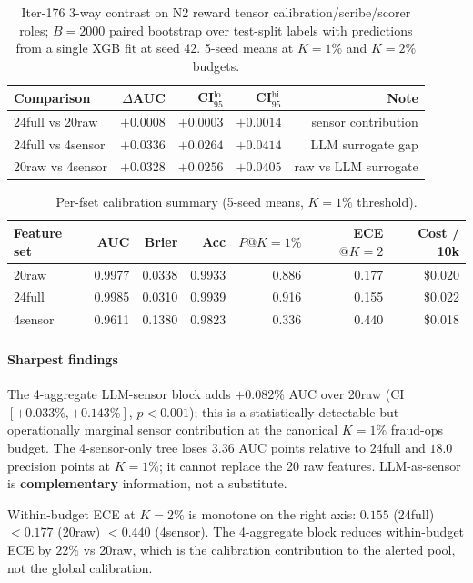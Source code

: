 \begin{table}[h]
\centering\small
\caption{Iter-176 3-way contrast on N2 reward tensor
calibration/scribe/scorer roles; $B{=}2000$ paired bootstrap over
test-split labels with predictions from a single XGB fit at seed 42.
5-seed means at $K{=}1\%$ and $K{=}2\%$ budgets.}
\label{tab:p8-iter176-headline}
\begin{tabular}{lrrrr}
\hline
Comparison & $\Delta$AUC & CI$_{95}^{\mathrm{lo}}$ & CI$_{95}^{\mathrm{hi}}$ & Note \\
\hline
24full vs 20raw & $+0.0008$ & $+0.0003$ & $+0.0014$ & sensor contribution \\
24full vs 4sensor & $+0.0336$ & $+0.0264$ & $+0.0414$ & LLM surrogate gap \\
20raw vs 4sensor & $+0.0328$ & $+0.0256$ & $+0.0405$ & raw vs LLM surrogate \\
\hline
\end{tabular}
\end{table}

\begin{table}[h]
\centering\small
\caption{Per-fset calibration summary (5-seed means, $K{=}1\%$ threshold).}
\label{tab:p8-iter176-calib}
\begin{tabular}{lrrrrrr}
\hline
Feature set & AUC & Brier & Acc & $P@K{=}1\%$ & ECE$@K{=}2$ & Cost / 10k \\
\hline
20raw  & 0.9977 & 0.0338 & 0.9933 & 0.886 & 0.177 & \$0.020 \\
24full & 0.9985 & 0.0310 & 0.9939 & 0.916 & 0.155 & \$0.022 \\
4sensor& 0.9611 & 0.1380 & 0.9823 & 0.336 & 0.440 & \$0.018 \\
\hline
\end{tabular}
\end{table}

\paragraph{Sharpest findings}
The 4-aggregate LLM-sensor block adds $+0.082\%$ AUC over 20raw
(CI $[+0.033\%, +0.143\%]$, $p<0.001$); this is a statistically
detectable but operationally marginal sensor contribution at the
canonical $K{=}1\%$ fraud-ops budget. The 4-sensor-only tree loses
$3.36$ AUC points relative to 24full and $18.0$ precision points at
$K{=}1\%$; it cannot replace the 20 raw features. LLM-as-sensor is
\textbf{complementary} information, not a substitute.

Within-budget ECE at $K{=}2\%$ is monotone on the right axis:
$0.155$ (24full) $< 0.177$ (20raw) $< 0.440$ (4sensor).
The 4-aggregate block reduces within-budget ECE by $22\%$ vs 20raw,
which is the calibration contribution to the alerted pool, not the
global calibration.


